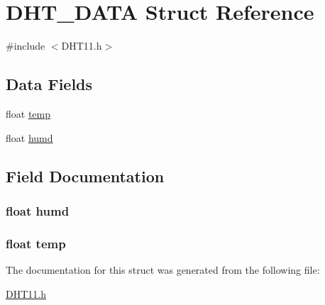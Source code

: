 \hypertarget{struct_d_h_t___d_a_t_a}{}\section{D\+H\+T\+\_\+\+D\+A\+T\+A Struct Reference}
\label{struct_d_h_t___d_a_t_a}


{\ttfamily \#include $<$D\+H\+T11.\+h$>$}

\subsection*{Data Fields}
\begin{DoxyCompactItemize}
\item 
float \hyperlink{struct_d_h_t___d_a_t_a_a24d61a35b72d7299eb6b5f48e71a571b}{temp}
\item 
float \hyperlink{struct_d_h_t___d_a_t_a_a7144c83d2b3c836d10837e4e48fefb96}{humd}
\end{DoxyCompactItemize}


\subsection{Field Documentation}
\hypertarget{struct_d_h_t___d_a_t_a_a7144c83d2b3c836d10837e4e48fefb96}{}
\subsubsection[{humd}]{\setlength{\rightskip}{0pt plus 5cm}float humd}\label{struct_d_h_t___d_a_t_a_a7144c83d2b3c836d10837e4e48fefb96}
\hypertarget{struct_d_h_t___d_a_t_a_a24d61a35b72d7299eb6b5f48e71a571b}{}
\subsubsection[{temp}]{\setlength{\rightskip}{0pt plus 5cm}float temp}\label{struct_d_h_t___d_a_t_a_a24d61a35b72d7299eb6b5f48e71a571b}


The documentation for this struct was generated from the following file\+:\begin{DoxyCompactItemize}
\item 
\hyperlink{_d_h_t11_8h}{D\+H\+T11.\+h}\end{DoxyCompactItemize}
